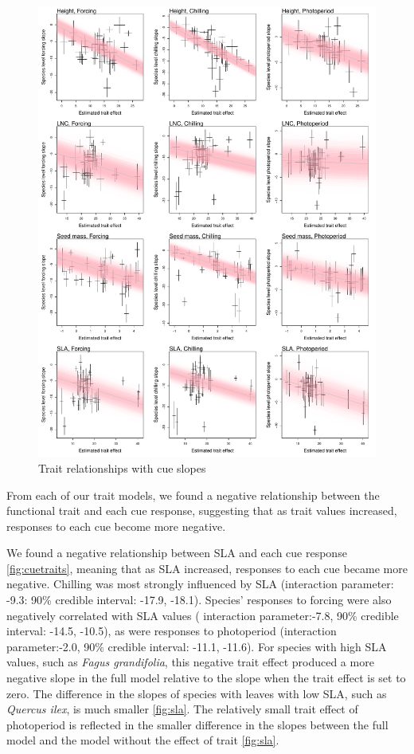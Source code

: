 \documentclass{article}\usepackage[]{graphicx}\usepackage[]{color}
\begin{document}
\begin{figure}[h!]
    \centering
 \includegraphics[width=\textwidth]{..//..//analyses/traits/figures/cuetrait_wtrend.pdf} 
    \caption{Trait relationships with cue slopes}
    \label{fig:cuetraits_wtrend}
\end{figure}

From each of our trait models, we found a negative relationship between the functional trait and each cue response, suggesting that as trait values increased, responses to each cue become more negative. 

We found a negative relationship between SLA and each cue response  \ref{fig:cuetraits}, meaning that as SLA increased, responses to each cue became more negative. Chilling was most strongly influenced by SLA (interaction parameter: -9.3: 90\% credible interval: -17.9, -18.1). Species' responses to forcing were also negatively correlated with SLA values ( interaction parameter:-7.8, 90\% credible interval: -14.5, -10.5), as were responses to photoperiod (interaction parameter:-2.0, 90\% credible interval: -11.1, -11.6). For species with high SLA values, such as \textit{Fagus grandifolia}, this negative trait effect produced a more negative slope in the full model relative to the slope when the trait effect is set to zero. The difference in the slopes of species with leaves with low SLA, such as \textit{Quercus ilex}, is much smaller \ref{fig:sla}. The relatively small trait effect of photoperiod is reflected in the smaller difference in the slopes between the full model and the model without the effect of trait \ref{fig:sla}.
\end{document}
